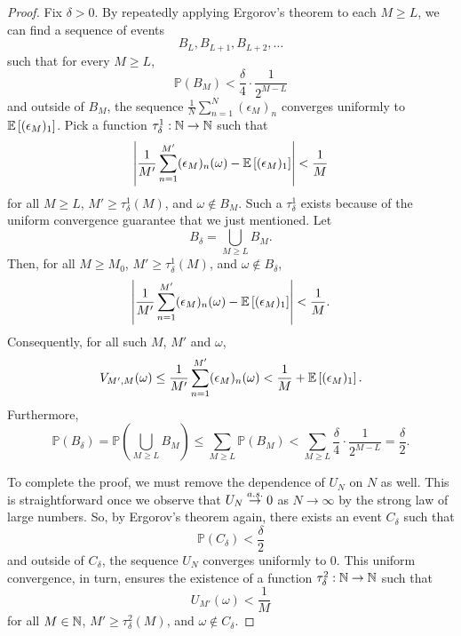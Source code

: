 \begin{proof}
        Fix $\delta > 0$. By repeatedly applying Ergorov's theorem to each $M \geq L$,
        we can find a sequence of events 
        \[
                B_{L}, B_{L+1}, B_{L+2}, \ldots
        \]
        such that for every $M \geq L$,
        \[
                \mathbb{P}(B_{M}) < \frac{\delta}{4} \cdot \frac{1}{2^{M-L}}
        \]
        and outside of $B_{M}$, the sequence $\frac{1}{N} \sum_{n=1}^N (\epsilon_M)_n$
        converges uniformly to $\mathbb{E}\left[(\epsilon_M)_1\right]$. Pick a function 
        $\tau^1_\delta : \mathbb{N} \to \mathbb{N}$ such that 
	\[ 
                \left|\frac{1}{M'} \sum_{n=1}^{M'} (\epsilon_M)_n(\omega) - \mathbb{E}\left[(\epsilon_M)_1\right]\right| < \frac{1}{M} 
        \]
        for all $M \geq L$, $M' \geq \tau^1_\delta(M)$, and $\omega \not\in B_M$. Such a $\tau^1_\delta$ exists
        because of the uniform convergence guarantee that we just mentioned. Let 
        \[
                B_\delta = \bigcup_{M \geq L} B_M.
        \]
        Then, for all $M \geq M_0$, $M' \geq \tau^1_\delta(M)$, and $\omega \not\in B_\delta$, 
	\[ 
                \left|\frac{1}{M'} \sum_{n=1}^{M'} (\epsilon_M)_n(\omega) - \mathbb{E}\left[(\epsilon_M)_1\right]\right| < \frac{1}{M}.
        \]
        Consequently, for all such $M$, $M'$ and $\omega$,
        \begin{equation} 
                \label{eqn:almostsure:1}
                V_{M',M}(\omega)
                \leq
                \frac{1}{M'} \sum_{n=1}^{M'} (\epsilon_M)_n(\omega) 
                < 
                \frac{1}{M} + \mathbb{E}\left[(\epsilon_M)_1\right].
        \end{equation}
        Furthermore, 
        \begin{equation} 
                \label{eqn:almostsure:2}
                \mathbb{P}(B_\delta) =
                \mathbb{P}\left(\bigcup_{M \geq L} B_M\right)
                \leq 
                \sum_{M \geq L} \mathbb{P}\left(B_M\right)
                < \sum_{M \geq L} \frac{\delta}{4} \cdot \frac{1}{2^{M-L}}
                = \frac{\delta}{2}.
        \end{equation}


	To complete the proof, we must remove the dependence of $U_N$ on $N$ as well. This is
	straightforward once we observe that $U_N \overset{a.s.}{\to} 0$ as $N \to \infty$ by the strong law of 
        large numbers. So, by Ergorov's theorem again, there exists an event $C_\delta$ such that
        \begin{equation} 
                \label{eqn:almostsure:3}
                \mathbb{P}(C_\delta) < \frac{\delta}{2}
        \end{equation}
        and outside of $C_\delta$, the sequence $U_N$ converges uniformly to $0$. This uniform convergence,
        in turn, ensures the existence of a function $\tau^2_\delta : \mathbb{N} \to \mathbb{N}$ such that
        \begin{equation} 
                \label{eqn:almostsure:4}
                U_{M'}(\omega) < \frac{1}{M} 
        \end{equation}
        for all $M \in \mathbb{N}$, $M' \geq \tau^2_\delta(M)$, and $\omega \not\in C_\delta$.
	

\end{proof}
